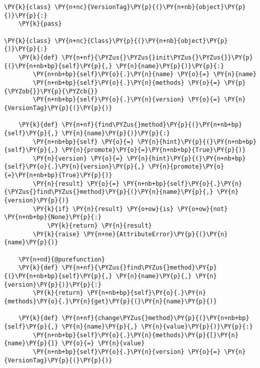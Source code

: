 \begin{Verbatim}[commandchars=\\\{\}]
\PY{k}{class} \PY{n+nc}{VersionTag}\PY{p}{(}\PY{n+nb}{object}\PY{p}{)}\PY{p}{:}
    \PY{k}{pass}

\PY{k}{class} \PY{n+nc}{Class}\PY{p}{(}\PY{n+nb}{object}\PY{p}{)}\PY{p}{:}
    \PY{k}{def} \PY{n+nf}{\PYZus{}\PYZus{}init\PYZus{}\PYZus{}}\PY{p}{(}\PY{n+nb+bp}{self}\PY{p}{,} \PY{n}{name}\PY{p}{)}\PY{p}{:}
        \PY{n+nb+bp}{self}\PY{o}{.}\PY{n}{name} \PY{o}{=} \PY{n}{name}
        \PY{n+nb+bp}{self}\PY{o}{.}\PY{n}{methods} \PY{o}{=} \PY{p}{\PYZob{}}\PY{p}{\PYZcb{}}
        \PY{n+nb+bp}{self}\PY{o}{.}\PY{n}{version} \PY{o}{=} \PY{n}{VersionTag}\PY{p}{(}\PY{p}{)}

    \PY{k}{def} \PY{n+nf}{find\PYZus{}method}\PY{p}{(}\PY{n+nb+bp}{self}\PY{p}{,} \PY{n}{name}\PY{p}{)}\PY{p}{:}
        \PY{n+nb+bp}{self} \PY{o}{=} \PY{n}{hint}\PY{p}{(}\PY{n+nb+bp}{self}\PY{p}{,} \PY{n}{promote}\PY{o}{=}\PY{n+nb+bp}{True}\PY{p}{)}
        \PY{n}{version} \PY{o}{=} \PY{n}{hint}\PY{p}{(}\PY{n+nb+bp}{self}\PY{o}{.}\PY{n}{version}\PY{p}{,} \PY{n}{promote}\PY{o}{=}\PY{n+nb+bp}{True}\PY{p}{)}
        \PY{n}{result} \PY{o}{=} \PY{n+nb+bp}{self}\PY{o}{.}\PY{n}{\PYZus{}find\PYZus{}method}\PY{p}{(}\PY{n}{name}\PY{p}{,} \PY{n}{version}\PY{p}{)}
        \PY{k}{if} \PY{n}{result} \PY{o+ow}{is} \PY{o+ow}{not} \PY{n+nb+bp}{None}\PY{p}{:}
            \PY{k}{return} \PY{n}{result}
        \PY{k}{raise} \PY{n+ne}{AttributeError}\PY{p}{(}\PY{n}{name}\PY{p}{)}

    \PY{n+nd}{@purefunction}
    \PY{k}{def} \PY{n+nf}{\PYZus{}find\PYZus{}method}\PY{p}{(}\PY{n+nb+bp}{self}\PY{p}{,} \PY{n}{name}\PY{p}{,} \PY{n}{version}\PY{p}{)}\PY{p}{:}
        \PY{k}{return} \PY{n+nb+bp}{self}\PY{o}{.}\PY{n}{methods}\PY{o}{.}\PY{n}{get}\PY{p}{(}\PY{n}{name}\PY{p}{)}

    \PY{k}{def} \PY{n+nf}{change\PYZus{}method}\PY{p}{(}\PY{n+nb+bp}{self}\PY{p}{,} \PY{n}{name}\PY{p}{,} \PY{n}{value}\PY{p}{)}\PY{p}{:}
        \PY{n+nb+bp}{self}\PY{o}{.}\PY{n}{methods}\PY{p}{[}\PY{n}{name}\PY{p}{]} \PY{o}{=} \PY{n}{value}
        \PY{n+nb+bp}{self}\PY{o}{.}\PY{n}{version} \PY{o}{=} \PY{n}{VersionTag}\PY{p}{(}\PY{p}{)}
\end{Verbatim}
